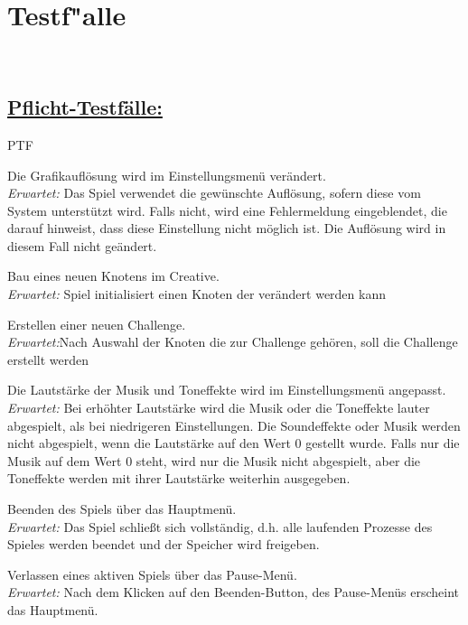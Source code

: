 %
%


%
%
\clearpage


\section{Testf{"a}lle}
\label{QS:TF}~\\

\subsection*{\underline{Pflicht-Testfälle:}}

\begin{ids}{\gls{PTF}}

	\id[10] Die Grafikauflösung wird im Einstellungsmenü verändert.\\
\textit{Erwartet:} Das Spiel verwendet die gewünschte Auflösung, sofern diese vom System unterstützt wird. Falls nicht, wird eine Fehlermeldung eingeblendet, die darauf hinweist, dass diese Einstellung nicht möglich ist. Die Auflösung wird in diesem Fall nicht geändert.

	\id[20] Bau eines neuen Knotens im Creative.\\
\textit{Erwartet:} Spiel initialisiert einen Knoten der verändert werden kann

	\id[30] Erstellen einer neuen Challenge.\\
\textit{Erwartet:}Nach Auswahl der Knoten die zur Challenge gehören, soll die Challenge erstellt werden

	\id[40] Die Lautstärke der Musik und Toneffekte wird im Einstellungsmenü angepasst. \\  
\textit{Erwartet:} Bei erhöhter Lautstärke wird die Musik oder die Toneffekte lauter abgespielt, als bei niedrigeren Einstellungen. Die Soundeffekte oder Musik werden nicht abgespielt, wenn die Lautstärke auf den Wert 0 gestellt wurde. Falls nur die Musik auf dem Wert 0 steht, wird nur die Musik nicht abgespielt, aber die Toneffekte werden mit ihrer Lautstärke weiterhin ausgegeben.

	\id[50] Beenden des Spiels über das Hauptmenü.\\
\textit{Erwartet:} Das Spiel schließt sich vollständig, d.h. alle laufenden Prozesse des Spieles werden beendet und der Speicher wird freigeben.

	\id[60] Verlassen eines aktiven Spiels über das Pause-Menü.\\
\textit{Erwartet:} Nach dem Klicken auf den Beenden-Button, des Pause-Menüs erscheint das Hauptmenü.


\end{ids}
